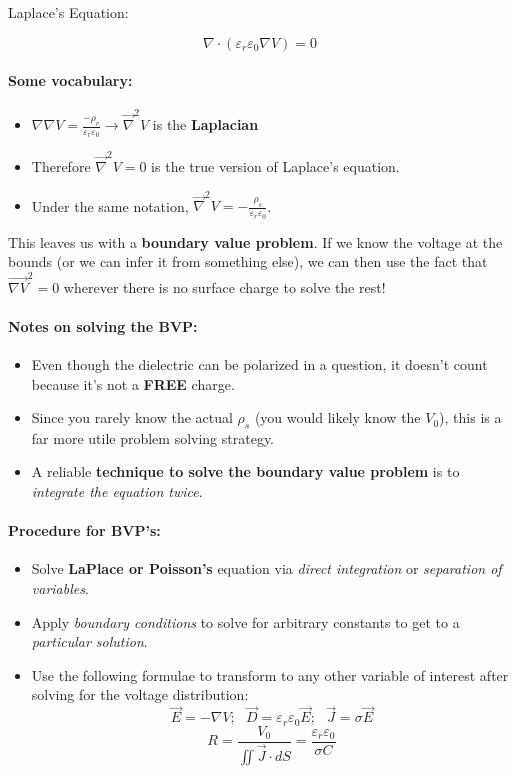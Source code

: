\documentclass[a4paper,12pt]{report}
\begin{document}
Laplace's Equation:

$$\nabla\cdot(\varepsilon_r\varepsilon_0 \nabla V) = 0$$

\paragraph{Some vocabulary: } 
\begin{itemize}
\item $\nabla \nabla V = \frac{-\rho_v}{\varepsilon_r\varepsilon_0} \to \vec{\nabla}^2 V$ is the \textbf{Laplacian} 
\item Therefore $\vec{\nabla}^2 V = 0$ is the true version of Laplace's equation.
\item Under the same notation, $\vec{\nabla}^2V = -\frac{\rho_s}{\varepsilon_r \varepsilon_0}$.
\end{itemize}

This leaves us with a \textbf{boundary value problem}. If we know the voltage at the bounds (or we can infer it from something else), we can then use the fact that $\vec{\nabla{V}}^2 = 0$ wherever there is no surface charge to solve the rest!

\paragraph{Notes on solving the BVP: }
\begin{itemize}
\item Even though the dielectric can be polarized in a question, it doesn't count because it's not a \textbf{FREE} charge.
\item Since you rarely know the actual $\rho_s$ (you would likely know the $V_0$), this is a far more utile problem solving strategy.
\item A reliable \textbf{technique to solve the boundary value problem} is to \textit{integrate the equation twice}.
\end{itemize}

\paragraph{Procedure for BVP's: } 
\begin{itemize}
\item Solve \textbf{LaPlace or Poisson's} equation via \textit{direct integration} or \textit{separation of variables}.
\item Apply \textit{boundary conditions} to solve for arbitrary constants to get to a \textit{particular solution}.
\item Use the following formulae to transform to any other variable of interest after solving for the voltage distribution:
$$\vec{E} = -\nabla V; \,\,\,\, \vec{D} = \varepsilon_r\varepsilon_0 \vec{E}; \,\,\,\, \vec{J} = \sigma \vec{E}$$
$$R = \frac{V_0}{\iint \vec{J} \cdot dS} = \frac{\varepsilon_r \varepsilon_0}{\sigma C}$$
\end{itemize}
\end{document}
